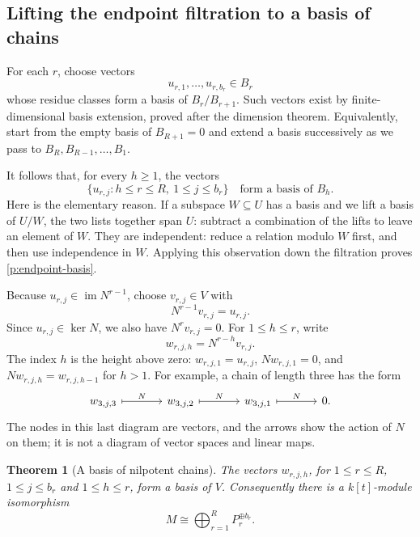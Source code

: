 \documentclass[11pt]{article}
\newtheorem{theorem}{Theorem}[section]
\theoremstyle{definition}
\theoremstyle{remark}\newtheorem{remark}[theorem]{Remark}
\DeclareMathOperator{\Ker}{ker}
\DeclareMathOperator{\im}{im}
\begin{document}
\subsection{Lifting the endpoint filtration to a basis of chains}
\label{p:chain-construction}

For each $r$, choose vectors
\[
 u_{r,1},\ldots,u_{r,b_r}\in B_r
\]
whose residue classes form a basis of $B_r/B_{r+1}$. Such vectors exist by
finite-dimensional basis extension, proved after the dimension theorem.
Equivalently, start from the empty basis of $B_{R+1}=0$ and extend a basis
successively as we pass to $B_R,B_{R-1},\ldots,B_1$.

It follows that, for every $h\geq1$, the vectors
\begin{equation}
\label{p:endpoint-basis}
 \{u_{r,j}:h\leq r\leq R,\ 1\leq j\leq b_r\}
 \quad\text{form a basis of } B_h.
\end{equation}
Here is the elementary reason. If a subspace $W\subseteq U$ has a basis and
we lift a basis of $U/W$, the two lists together span $U$: subtract a
combination of the lifts to leave an element of $W$. They are independent:
reduce a relation modulo $W$ first, and then use independence in $W$.
Applying this observation down the filtration proves
\eqref{p:endpoint-basis}.

Because $u_{r,j}\in\im N^{r-1}$, choose $v_{r,j}\in V$ with
\[
 N^{r-1}v_{r,j}=u_{r,j}.
\]
Since $u_{r,j}\in\Ker N$, we also have $N^rv_{r,j}=0$. For
$1\leq h\leq r$, write
\[
 w_{r,j,h}=N^{r-h}v_{r,j}.
\]
The index $h$ is the height above zero: $w_{r,j,1}=u_{r,j}$,
$Nw_{r,j,1}=0$, and $Nw_{r,j,h}=w_{r,j,h-1}$ for $h>1$.
For example, a chain of length three has the form
\[
\begin{tikzcd}[column sep=large]
 w_{3,j,3} \arrow[r,mapsto,"N"] &
 w_{3,j,2} \arrow[r,mapsto,"N"] &
 w_{3,j,1} \arrow[r,mapsto,"N"] &0.
\end{tikzcd}
\]
The nodes in this last diagram are vectors, and the arrows show the action
of $N$ on them; it is not a diagram of vector spaces and linear maps.

\begin{theorem}[A basis of nilpotent chains]
\label{p:chain-basis}
The vectors $w_{r,j,h}$, for $1\leq r\leq R$, $1\leq j\leq b_r$ and
$1\leq h\leq r$, form a basis of $V$.
Consequently there is a $k[t]$-module isomorphism
\[
 M\cong\bigoplus_{r=1}^{R}P_r^{\oplus b_r}.
\]
\end{theorem}
\end{document}
